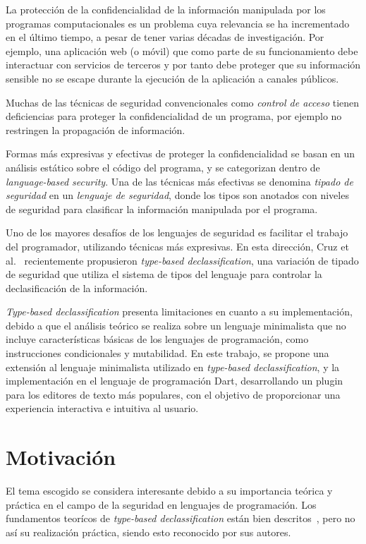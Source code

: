 \begin{intro}

	La protección de la confidencialidad de la información manipulada por los programas computacionales es un problema cuya relevancia se ha incrementado en el último tiempo, a pesar de tener varias décadas de investigación. Por ejemplo, una aplicación web (o móvil) que como parte de su funcionamiento debe interactuar con servicios de terceros y por tanto debe proteger que su información sensible no se escape durante la ejecución de la aplicación a canales públicos.

	Muchas de las técnicas de seguridad convencionales como \textit{control de acceso} tienen deficiencias para proteger la confidencialidad de un programa, por ejemplo no restringen la propagación de información\cite{myers-phd}.

	Formas más expresivas y efectivas de proteger la confidencialidad se basan en un análisis estático sobre el código del programa, y se categorizan dentro de \textit{language-based security}. Una de las técnicas más efectivas se denomina \textit{tipado de seguridad} en un \textit{lenguaje de seguridad}, donde los tipos son anotados con niveles de seguridad para clasificar la información manipulada por el programa.

	Uno de los mayores desafíos de los lenguajes de seguridad es facilitar el trabajo del programador, utilizando técnicas más expresivas. En esta dirección, Cruz et al.~\cite{cruzAl:ecoop2017} recientemente propusieron \textit{type-based declassification}, una variación de tipado de seguridad que utiliza el sistema de tipos del lenguaje para controlar la declasificación de la información.

	\textit{Type-based declassification} presenta limitaciones en cuanto a su implementación, debido a que el análisis teórico se realiza sobre un lenguaje minimalista que no incluye características básicas de los lenguajes de programación, como instrucciones condicionales y mutabilidad. En este trabajo, se propone una extensión al lenguaje minimalista utilizado en \textit{type-based declassification}, y la implementación en el lenguaje de programación Dart, desarrollando un plugin para los editores de texto más populares, con el objetivo de proporcionar una experiencia interactiva e intuitiva al usuario.



		\section{Motivación}
	El tema escogido se considera interesante debido a su importancia teórica y práctica en el campo de la seguridad en lenguajes de programación. Los fundamentos teorícos de \textit{type-based declassification} están bien descritos~\cite{cruzAl:ecoop2017}, pero no así su realización práctica, siendo esto reconocido por sus autores.


\end{intro}
